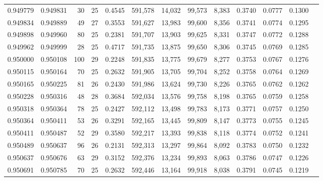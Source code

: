 \begin{tabular}{rrrrrrrrrrrrr}
0.949779 & 0.949831 &    30 &  25 &                                     0.4545 & 591,578 &  14,032 &  99,573 &   8,383 & 0.3740 & 0.0777 & 0.1300 \\
0.949834 & 0.949889 &    49 &  27 &                                     0.3553 & 591,627 &  13,983 &  99,600 &   8,356 & 0.3741 & 0.0774 & 0.1295 \\
0.949898 & 0.949960 &    80 &  25 &                                     0.2381 & 591,707 &  13,903 &  99,625 &   8,331 & 0.3747 & 0.0772 & 0.1288 \\
0.949962 & 0.949999 &    28 &  25 &                                     0.4717 & 591,735 &  13,875 &  99,650 &   8,306 & 0.3745 & 0.0769 & 0.1285 \\
0.950000 & 0.950108 &   100 &  29 &                                     0.2248 & 591,835 &  13,775 &  99,679 &   8,277 & 0.3753 & 0.0767 & 0.1276 \\
0.950115 & 0.950164 &    70 &  25 &                                     0.2632 & 591,905 &  13,705 &  99,704 &   8,252 & 0.3758 & 0.0764 & 0.1269 \\
0.950165 & 0.950225 &    81 &  26 &                                     0.2430 & 591,986 &  13,624 &  99,730 &   8,226 & 0.3765 & 0.0762 & 0.1262 \\
0.950228 & 0.950316 &    48 &  28 &                                     0.3684 & 592,034 &  13,576 &  99,758 &   8,198 & 0.3765 & 0.0759 & 0.1258 \\
0.950318 & 0.950364 &    78 &  25 &                                     0.2427 & 592,112 &  13,498 &  99,783 &   8,173 & 0.3771 & 0.0757 & 0.1250 \\
0.950364 & 0.950411 &    53 &  26 &                                     0.3291 & 592,165 &  13,445 &  99,809 &   8,147 & 0.3773 & 0.0755 & 0.1245 \\
0.950411 & 0.950487 &    52 &  29 &                                     0.3580 & 592,217 &  13,393 &  99,838 &   8,118 & 0.3774 & 0.0752 & 0.1241 \\
0.950489 & 0.950637 &    96 &  26 &                                     0.2131 & 592,313 &  13,297 &  99,864 &   8,092 & 0.3783 & 0.0750 & 0.1232 \\
0.950637 & 0.950676 &    63 &  29 &                                     0.3152 & 592,376 &  13,234 &  99,893 &   8,063 & 0.3786 & 0.0747 & 0.1226 \\
0.950691 & 0.950785 &    70 &  25 &                                     0.2632 & 592,446 &  13,164 &  99,918 &   8,038 & 0.3791 & 0.0745 & 0.1219 \\

\end{tabular}
